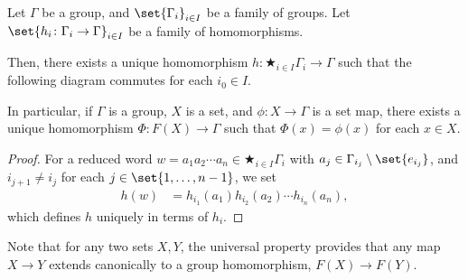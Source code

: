 \documentclass[10pt]{mypackage}
\begin{document}
\begin{theorem}
  Let $\Gamma$ be a group, and $\set{\Gamma_i}_{i\in I}$ be a family of groups. Let $\set{h_{i}\colon \Gamma_i\rightarrow \Gamma}_{i\in I}$ be a family of homomorphisms.\newline

  Then, there exists a unique homomorphism $h\colon \bigstar_{i\in I}\Gamma_{i}\rightarrow \Gamma$ such that the following diagram commutes for each $i_0\in I$.
  \begin{center}
  \end{center}
  In particular, if $\Gamma$ is a group, $X$ is a set, and $\phi\colon X\rightarrow \Gamma$ is a set map, there exists a unique homomorphism $\Phi\colon F(X)\rightarrow \Gamma$ such that $\Phi(x) = \phi(x)$ for each $x\in X$.
\end{theorem}
\begin{proof}
  For a reduced word $w = a_1a_2\cdots a_n\in \bigstar_{i\in I}\Gamma_i$ with $a_j\in \Gamma_{i_j}\setminus \set{e_{i_j}}$, and $i_{j+1}\neq i_{j}$ for each $j\in \set{1,\dots,n-1}$, we set
  \begin{align*}
    h\left(w\right) &= h_{i_1}\left(a_1\right)h_{i_2}\left(a_2\right)\cdots h_{i_n}\left(a_n\right),
  \end{align*}
  which defines $h$ uniquely in terms of $h_{i}$.
\end{proof}
Note that for any two sets $X,Y$, the universal property provides that any map $X\rightarrow Y$ extends canonically to a group homomorphism, $F(X) \rightarrow F(Y)$.
\begin{center}
\end{center}
\end{document}
